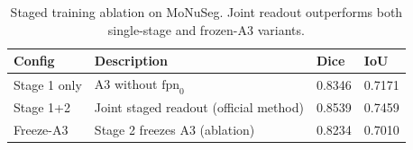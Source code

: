 \begin{table}[htbp]
  \centering
  \small
  \begin{tabular}{llll}
  \toprule
  \textbf{Config} & \textbf{Description} & \textbf{Dice} & \textbf{IoU} \\
  \midrule
  Stage 1 only & A3 without $\text{fpn}_0$ & 0.8346 & 0.7171 \\
  Stage 1+2 & Joint staged readout (official method) & 0.8539 & 0.7459 \\
  Freeze-A3 & Stage 2 freezes A3 (ablation) & 0.8234 & 0.7010 \\
  \bottomrule
  \end{tabular}
  \caption{Staged training ablation on MoNuSeg. Joint readout outperforms both single-stage and frozen-A3 variants.}
  \label{tab:staging}
\end{table}
